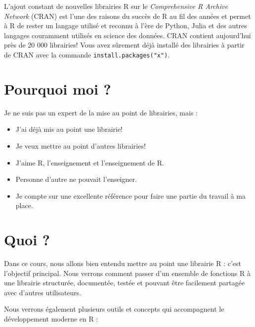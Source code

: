 \documentclass[
  letterpaper,
  DIV=11,
  numbers=noendperiod]{scrreprt}
\providecommand{\tightlist}{%
  \setlength{\itemsep}{0pt}\setlength{\parskip}{0pt}}\usepackage{longtable,booktabs,array}
\begin{document}
L'ajout constant de nouvelles librairies R sur le \emph{Comprehensive R
Archive Network} (CRAN) est l'une des raisons du succès de R au fil des
années et permet à R de rester un langage utilisé et reconnu à l'ère de
Python, Julia et des autres langages couramment utilisés en science des
données. CRAN contient aujourd'hui près de 20 000 librairies! Vous avez
sûrement déjà installé des librairies à partir de CRAN avec la commande
\texttt{install.packages("x")}.

\section*{Pourquoi moi ?}\label{pourquoi-moi}


Je ne suis pas un expert de la mise au point de librairies, mais :

\begin{itemize}
\tightlist
\item
  J'ai déjà mis au point une librairie!
\item
  Je veux mettre au point d'autres librairies!
\item
  J'aime R, l'enseignement et l'enseignement de R.
\item
  Personne d'autre ne pouvait l'enseigner.
\item
  Je compte sur une excellente référence pour faire une partie du
  travail à ma place.
\end{itemize}

\section*{Quoi ?}\label{quoi}


Dans ce cours, nous allons bien entendu mettre au point une librairie R
: c'est l'objectif principal. Nous verrons comment passer d'un ensemble
de fonctions R à une librairie structurée, documentée, testée et pouvant
être facilement partagée avec d'autres utilisateurs.

Nous verrons également plusieurs outils et concepts qui accompagnent le
développement moderne en R :
\end{document}
